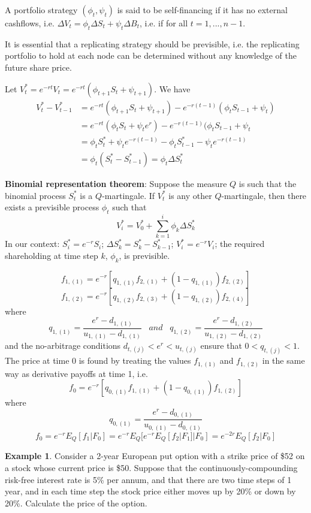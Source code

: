 \documentclass[11pt,a4paper]{book}
\theoremstyle{definition}\newtheorem{definition}{Definition}
\theoremstyle{definition}\newtheorem{fact}{Fact}
\theoremstyle{definition}\newtheorem{remark}{Remark}
\theoremstyle{definition}\newtheorem{ex}{Ex.}
\theoremstyle{definition}\newtheorem{project}{Project}
\theoremstyle{definition}\newtheorem{problem}{Problem}
\theoremstyle{definition}\newtheorem{example}{Example}
\numberwithin{theorem}{section}
\numberwithin{corollary}{chapter}
\numberwithin{assumption}{chapter}
\numberwithin{definition}{chapter}
\numberwithin{prop}{chapter}
\numberwithin{notation}{chapter}
\numberwithin{problem}{chapter}
\numberwithin{example}{chapter}
\numberwithin{fact}{chapter}
\numberwithin{ex}{chapter}
\begin{document}
A portfolio strategy $(\phi_t, \psi_t)$ is said to be self-financing if it has no external cashflows, i.e. $\Delta V_t = \phi_t \Delta S_t + \psi_t \Delta B_t$, i.e. if for all $t=1, ..., n-1$.

It is essential that a replicating strategy should be previsible, i.e. the replicating portfolio to hold at each node can be determined without any knowledge of the future share price.

Let $V_t^* = e^{-rt} V_t = 	e^{-rt} (\phi_{t+1} S_t + \psi_{t+1})$. We have
\begin{align*}
V_t^* - V_{t-1}^* &= e^{-rt} (\phi_{t+1} S_t + \psi_{t+1}) - e^{-r(t-1)} (\phi_t S_{t-1} + \psi_t) \\
&= e^{-rt} (\phi_t S_t + \psi_t e^r) - e^{-r(t-1)} (\phi_t S_{t-1} + \psi_t \\
&= \phi_t S_t^* + \psi_t e^{-r(t-1)} - \phi_t S_{t-1}^* - \psi_t e^{-r(t-1)} \\
&= \phi_t (S_t^* - S_{t-1}^*) = \phi_t \Delta S_t^*
\end{align*}

\textbf{Binomial representation theorem}: Suppose the measure $Q$ is such that the binomial process $S_t^*$ is a $Q$-martingale. If $V_t^*$ is any other $Q$-martingale, then there exists a previsible process $\phi_t$ such that
$$ V_i^* = V_0^* + \sum_{k=1}^i \phi_k \Delta S_k^* $$
In our context: $S_i^* = e^{-r} S_i$; $\Delta S_k^* = S_k^* - S_{k-1}^*$; $V_i^* =
e^{-r} V_i$; the required shareholding at time step $k$, $\phi_k$, is previsible.

$$ f_{1,(1)} = e^{-r} [q_{1,(1)} f_{2,(1)} + (1-q_{1,(1)})f_{2,(2)}] $$
$$ f_{1,(2)} = e^{-r} [q_{1,(2) }f_{2,(3)} + (1-q_{1,(2)})f_{2,(4)}] $$
where
$$ q_{1,(1)} = \frac{e^r - d_{1,(1)}}{u_{1,(1)} - d_{1,(1)}} \,\,\,\,\,and\,\,\,\,\, q_{1,(2)} = \frac{e^r - d_{1,(2)}}{u_{1,(2)} - d_{1,(2)}} $$
and the no-arbitrage conditions $d_{t,(j)} < e^r < u_{t,(j)}$ ensure that $0<q_{t,(j)}<1$. The price at time 0 is found by treating the values $f_{1,(1)}$ and $f_{1,(2)}$ in the same way as derivative payoffs at time 1, i.e.
$$ f_0 = e^{-r} [q_{0,(1)} f_{1,(1)} + (1-q_{0,(1)}) f_{1,(2)}] $$
where
$$ q_{0,(1)} = \frac{e^r - d_{0,(1)}}{u_{0,(1)} - d_{0,(1)}} $$
\begin{equation}
f_0 = e^{-r} E_Q[f_1|F_0] = e^{-r} E_Q[e^{-r}E_Q[f_2|F_1]|F_0] = e^{-2r} E_Q[f_2|F_0]
\end{equation}

\begin{example}
Consider a 2-year European put option with a strike price of \$52 on a stock whose current price is \$50. Suppose that the continuously-compounding risk-free interest rate is 5\% per annum, and that there are two time steps of 1 year, and in each time step the stock price either moves up by 20\% or down by 20\%. Calculate the price of the option.
\end{example}
\end{document}
